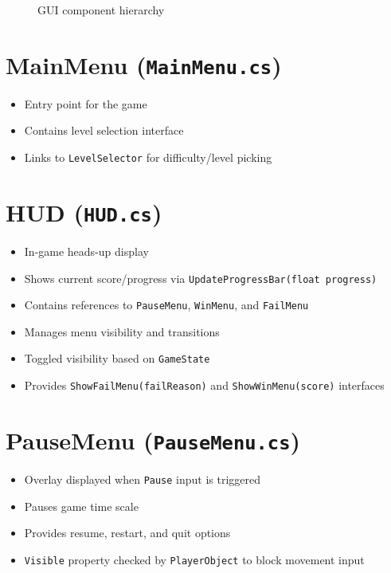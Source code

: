 \documentclass{report}
\begin{document}
\begin{figure}[H]
	\centering
	\caption{GUI component hierarchy}
	\label{fig:gui_hierarchy}
\end{figure}

\section{MainMenu (\texttt{MainMenu.cs})}
\begin{itemize}[noitemsep]
	\item Entry point for the game
	\item Contains level selection interface
	\item Links to \texttt{LevelSelector} for difficulty/level picking
\end{itemize}

\section{HUD (\texttt{HUD.cs})}
\begin{itemize}[noitemsep]
	\item In-game heads-up display
	\item Shows current score/progress via \texttt{UpdateProgressBar(float progress)}
	\item Contains references to \texttt{PauseMenu}, \texttt{WinMenu}, and \texttt{FailMenu}
	\item Manages menu visibility and transitions
	\item Toggled visibility based on \texttt{GameState}
	\item Provides \texttt{ShowFailMenu(failReason)} and \texttt{ShowWinMenu(score)} interfaces
\end{itemize}

\section{PauseMenu (\texttt{PauseMenu.cs})}
\begin{itemize}[noitemsep]
	\item Overlay displayed when \texttt{Pause} input is triggered
	\item Pauses game time scale
	\item Provides resume, restart, and quit options
	\item \texttt{Visible} property checked by \texttt{PlayerObject} to block movement input
\end{itemize}
\end{document}
